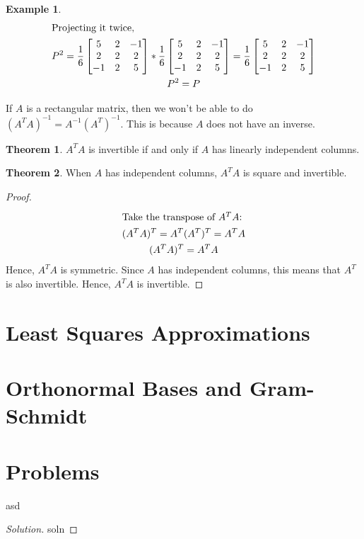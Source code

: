 \documentclass[12pt, letterpaper]{article}
\newcommand{\DefinitionSpace}{\vspace{15px}}
\theoremstyle{definition}
\newtheorem{example}{Example}
\newtheorem{theorem}{Theorem}
\newenvironment{problem}[2][Problem]{\begin{trivlist}
		\item[\hskip \labelsep {\bfseries #1}\hskip \labelsep {\bfseries #2.}]}{\end{trivlist}}
\begin{document}
\begin{example}
\begin{gather*}
		\intertext{Projecting it twice,}
			P^2 = \frac{1}{6} \begin{bmatrix} 5 & 2 & -1\\ 2 & 2 & 2 \\ -1 & 2 & 5\end{bmatrix} * \frac{1}{6} \begin{bmatrix} 5 & 2 & -1\\ 2 & 2 & 2 \\ -1 & 2 & 5\end{bmatrix} = \frac{1}{6} \begin{bmatrix} 5 & 2 & -1\\ 2 & 2 & 2 \\ -1 & 2 & 5\end{bmatrix} \\
			P^2 = P
		\end{gather*}
	\end{example}\DefinitionSpace 

	If $A$ is a rectangular matrix, then we won't be able to do $(A^T A)^{-1}=A^{-1} (A^T)^{-1}$. This is because $A$ does not have an inverse.
	
		\begin{theorem}
			$A^T A$ is invertible if and only if $A$ has linearly independent columns.
		\end{theorem}\DefinitionSpace 

		\begin{theorem}
			When $A$ has independent columns, $A^T A$ is square and invertible.
		\end{theorem}
		\begin{proof}
			\begin{gather*}
				\intertext{Take the transpose of $A^T A$:}
					(A^T A)^T = A^T (A^T)^T = A^T A \\
					(A^T A)^T = A^T A
			\end{gather*}
			Hence, $A^T A$ is symmetric. Since $A$ has independent columns, this means that $A^T$ is also invertible. Hence, $A^T A$ is invertible.
		\end{proof}










\section{Least Squares Approximations}





\section{Orthonormal Bases and Gram-Schmidt}




\section{Problems}


	\begin{problem}{1.1}
		asd
	\end{problem}
	
	\begin{proof}[Solution]
		soln
	\end{proof}
	
	
	
	
	
	
	
\end{document}
